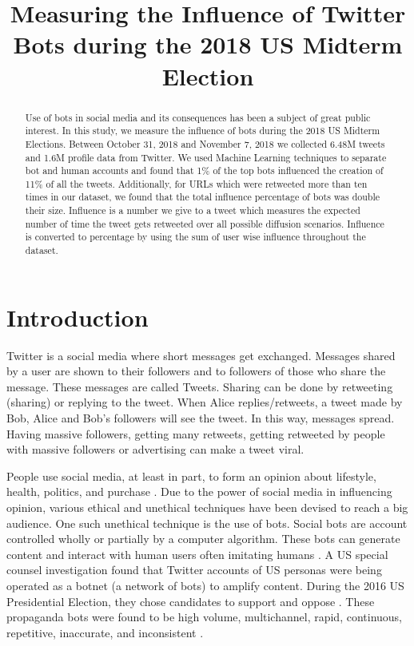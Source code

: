 \documentclass[letterpaper]{article}
\title{Measuring the Influence of Twitter Bots during the 2018 US Midterm Election}
\begin{document}
\maketitle

\begin{abstract}
    Use of bots in social media and its consequences has been a subject of great public interest. In this study, we measure the influence of bots during 
    the 2018 US Midterm Elections. Between October 31, 2018 and November 7, 2018 we collected 6.48M tweets and 1.6M profile data from Twitter. We used 
    Machine Learning techniques to separate bot and human accounts and found that 1\% of the
    top bots influenced the creation of 11\% of all the tweets. Additionally, for URLs which were retweeted more than ten times in our dataset, we found that the 
    total influence percentage of bots was double their size. 
    Influence is a number we give to a tweet which measures 
    the expected number of time the tweet gets retweeted over all possible diffusion scenarios. Influence is converted to percentage by using the sum of user wise influence 
    throughout the dataset.
\end{abstract}

\section{Introduction}
\label{sec:introduction}

Twitter is a social media where short messages get exchanged. Messages shared by a user are shown to
their followers and to followers of those who share the message. These messages are called Tweets. Sharing can be done by retweeting
(sharing) or replying to the tweet. When Alice replies/retweets, a tweet made by Bob, Alice and Bob's followers will see the tweet. In this
way, messages spread. Having massive followers, getting many retweets, getting retweeted by people with massive followers or advertising can make a tweet viral.\par

People use social media, at least in part, to form an opinion about lifestyle, health, politics, and purchase \cite{varol2017early}. 
Due to the power of social media in influencing opinion, various ethical and unethical techniques have been devised to reach a big audience. 
One such unethical technique is the use of bots. Social bots are account controlled wholly or partially by a computer algorithm. 
These bots can generate content and interact with human users often imitating humans \cite{ferrara2016rise}.
A US special counsel investigation found that Twitter accounts of US personas were being operated as a botnet (a network of bots) to amplify content. 
During the 2016 US Presidential Election, they chose candidates to support and oppose \cite{luceri2019red,mueller_investigation}. 
These propaganda bots were found to be high volume, multichannel, rapid, continuous, repetitive, inaccurate, and inconsistent \cite{paul2016russian}. \par
\end{document}

